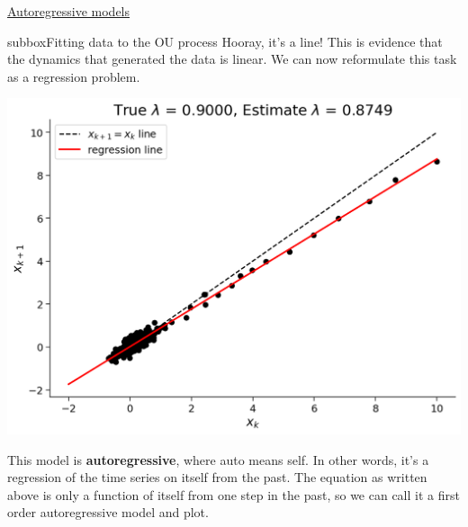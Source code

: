 \begin{textbox}{\href{https://compneuro.neuromatch.io/tutorials/W2D2_LinearSystems/student/W2D2_Tutorial4.html}{Autoregressive models } }
\begin{subbox}{subbox}{Fitting data to the OU process}
Hooray, it's a line! This is evidence that the dynamics that generated the data is linear. We can now reformulate this task as a regression problem.
\begin{center}
\includegraphics[scale=0.25]{Figures/LS/CDS_Figure10.png}
\end{center}
This model is \textbf{autoregressive}, where auto means self. In other words, it's a regression of the time series on itself from the past. The equation as written above is only a function of itself from one step in the past, so we can call it a first order autoregressive model and plot.


\end{subbox}

\end{textbox}
